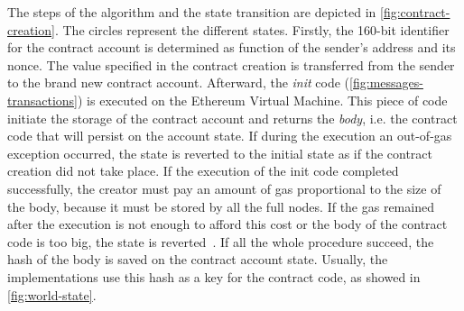 The steps of the algorithm and the state transition are depicted in
\autoref{fig:contract-creation}. The circles represent the different states.
Firstly, the 160-bit identifier for the contract account is determined as
function of the sender's address and its nonce. The value specified in the
contract
creation is transferred from the sender to the brand new contract account.
Afterward, the \emph{init} code (\autoref{fig:messages-transactions}) is
executed on the Ethereum Virtual Machine.
This  piece of code initiate the storage of the contract account and returns the
\emph{body}, i.e. the contract code that will persist on the account state. If
during the execution an out-of-gas exception occurred, the state is reverted to
the initial state as if the contract creation did not take place. If the
execution of the init code completed successfully, the creator must pay an
amount of gas proportional to the size of the body, because it must be
stored by all the full nodes. If the gas remained after the execution is not
enough to afford this cost or the body of the contract code is too big, the
state is reverted~\cite{wood2018ethereum}. If all the whole procedure succeed,
the hash of the body is saved on the contract account state. Usually, the
implementations use this hash as a key for the contract code, as showed in
\autoref{fig:world-state}.

